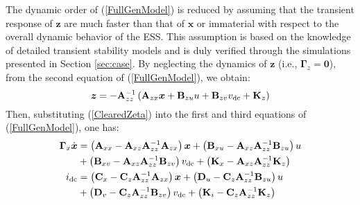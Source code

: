 \documentclass[journal, a4paper]{IEEEtran}
\begin{document}
The dynamic order of (\ref{FullGenModel}) is reduced by assuming that
the transient response of $\boldsymbol{z}$ are much faster than that
of $\boldsymbol{x}$ or immaterial with respect to the overall dynamic
behavior of the ESS.  This assumption is based on the knowledge of
detailed transient stability models and is
duly verified through the simulations presented in Section
\ref{sec:case}.  By neglecting the dynamics of $\boldsymbol{z}$ (i.e.,
$\mathbf{\Gamma}_{z} = \mathbf{0}$), from the second equation of
(\ref{FullGenModel}), we obtain:
\begin{equation}
  \boldsymbol{z} = - \mathbf{A}_{zz}^{-1} \left(
  \mathbf{A}_{zx}\boldsymbol{x} + \mathbf{B}_{zu}u +
  \mathbf{B}_{zv} v_{\rm dc} + \mathbf{K}_{z} \right)
  \label{ClearedZeta}
\end{equation}
Then, substituting (\ref{ClearedZeta}) into the first and third
equations of (\ref{FullGenModel}), one has:
\begin{alignat}{3}
  \nonumber \mathbf{\Gamma}_x \dot{\boldsymbol{x}} &=
  \left(\mathbf{A}_{xx} - \mathbf{A}_{xz}\mathbf{A}_{zz}^{-1}
    \mathbf{A}_{zx}\right)\boldsymbol{x} + \left(\mathbf{B}_{xu} -
    \mathbf{A}_{xz}\mathbf{A}_{zz}^{-1} \mathbf{B}_{zu}\right)u \\
  \nonumber &+ \left(\mathbf{B}_{xv} -
    \mathbf{A}_{xz}\mathbf{A}_{zz}^{-1} \mathbf{B}_{zv}\right)v_{\rm
    dc} +
  \left(\mathbf{K}_{x} - \mathbf{A}_{xz}\mathbf{A}_{zz}^{-1} \mathbf{K}_{z}\right)\\
  \nonumber i_{\rm dc} &= \left(\mathbf{C}_{x} -
    \mathbf{C}_{z}\mathbf{A}_{zz}^{-1}\mathbf{A}_{zx}\right)
  \boldsymbol{x} + \left(\mathbf{D}_{u} - \mathbf{C}_{z}
    \mathbf{A}_{zz}^{-1}\mathbf{B}_{zu}\right) u \\
  &+ \left(\mathbf{D}_{v} -
    \mathbf{C}_{z}\mathbf{A}_{zz}^{-1}\mathbf{B}_{zv}\right) v_{\rm
    dc} + \left(\mathbf{K}_{i} -
    \mathbf{C}_{z}\mathbf{A}_{zz}^{-1}\mathbf{K}_{z}\right)
  \label{w/o_zeta}
\end{alignat}
\end{document}
